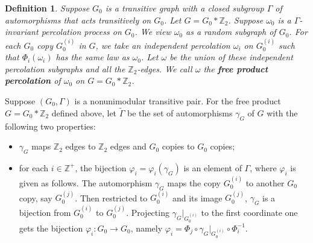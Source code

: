 \documentclass[12pt]{article}
\newtheorem{definition}[theorem]{Definition}
\numberwithin{equation}{section}
\newcommand{\1}{\mathbf{1}}
\newcommand{\notion}[1]{{\bf  \textit{#1}}}
\begin{document}


\begin{definition}
	Suppose $G_0$ is a transitive graph with a closed subgroup $\Gamma$ of automorphisms that acts transitively on $G_0$. Let $G=G_0*\mathbb{Z}_2$. Suppose $\omega_0$ is a $\Gamma$-invariant percolation process on $G_0$. We view $\omega_0$ as a random subgraph of $G_0$. For each   $G_0$ copy $G_0^{(i)}$ in $G$, we take an independent percolation $\omega_i$ on $G_0^{(i)}$ such that $\Phi_i(\omega_i)$ has the same law as $\omega_0$. 
	Let $\omega$ be the union of these independent percolation subgraphs and all the $\mathbb{Z}_2$-edges. We call $\omega$ the \notion{free product percolation} of $\omega_0$ on $G=G_0*\mathbb{Z}_2$. 
\end{definition}

Suppose $(G_0,\Gamma)$ is a nonunimodular transitive pair. For the free product $G=G_0*\mathbb{Z}_2$ defined above, let $\widetilde{\Gamma}$ be the set of automorphisms $\gamma_G$ of $G$ with the following two properties:
	\begin{itemize}
		\item $\gamma_G$ maps $\mathbb{Z}_2$ edges to $\mathbb{Z}_2$ edges and $G_0$ copies to $G_0$ copies;
		\item for each $i\in\mathbb{Z}^+$, the bijection $\varphi_i=\varphi_i(\gamma_G)$ is an element of $\Gamma$, where $\varphi_i$ is given as follows. The automorphism $\gamma_G$ maps the copy $G_0^{(i)}$ to another $G_0$ copy, say $G_0^{(j)}$. Then restricted to $G_0^{(i)}$ and its image $G_0^{(j)}$, $\gamma_G$ is a bijection  from $G_0^{(i)}$ to $G_0^{(j)}$. Projecting $\gamma_G\big|_{G_0^{(i)}}$ to the first coordinate one gets the bijection  $\varphi_i:G_0\rightarrow G_0$, namely $\varphi_i=\Phi_j\circ \gamma_G\big|_{G_0^{(i)}} \circ \Phi_i^{-1}$. 
	\end{itemize}
\end{document}
